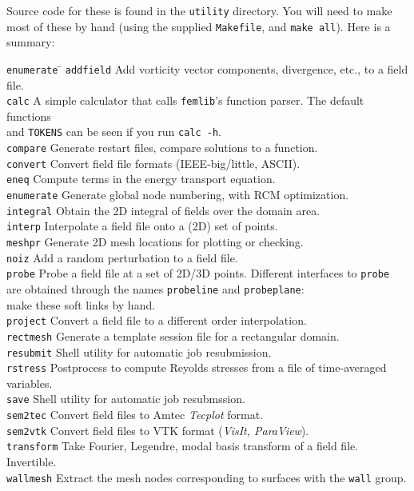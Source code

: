 \documentclass[11pt,a4paper]{report}
\begin{document}
Source code for these is found in the \texttt{utility} directory. You
will need to make most of these by hand (using the supplied
\texttt{Makefile}, and \texttt{make all}).  Here is a summary:
\begin{tabbing}
\texttt{enumerate}  \= \kill
\texttt{addfield} \>   
        Add vorticity vector components, divergence, etc., to a field
	file.\\
\texttt{calc} \>      
        A simple calculator that calls \verb+femlib+'s function
        parser. The default functions\\\>and \texttt{TOKENS} can be seen
        if you run \texttt{calc -h}.\\
\texttt{compare} \>   
        Generate restart files, compare solutions to a function.\\
\texttt{convert} \>   
        Convert field file formats (IEEE-big/little, ASCII).\\
\texttt{eneq} \>   
        Compute terms in the energy transport equation.\\
\texttt{enumerate}  \>
        Generate global node numbering, with RCM optimization.\\
\texttt{integral} \> Obtain the 2D integral of fields over the
        domain area.\\
\texttt{interp} \>   
        Interpolate a field file onto a (2D) set of points.\\
\texttt{meshpr} \>    
        Generate 2D mesh locations for plotting or checking.\\
\texttt{noiz} \>      
        Add a random perturbation to a field file.\\
\texttt{probe} \>   
        Probe a field file at a set of 2D/3D points. Different
        interfaces to \texttt{probe}\\ \> are obtained through the names
        \texttt{probeline} and \texttt{probeplane}: \\ \> make these soft
        links by hand.\\
\texttt{project} \>   
        Convert a field file to a different order interpolation.\\
\texttt{rectmesh} \>
        Generate a template session file for a rectangular domain.\\
\texttt{resubmit} \> Shell utility for automatic job resubmission.\\
\texttt{rstress} \>
	Postprocess to compute Reyolds stresses from a file of
        time-averaged variables.\\
\texttt{save} \> Shell utility for automatic job resubmssion.\\
\texttt{sem2tec} \>   
        Convert field files to Amtec \emph{Tecplot} format.\\
\texttt{sem2vtk} \>   
        Convert field files to VTK format (\emph{VisIt, ParaView}).\\
\texttt{transform} \>      
        Take Fourier, Legendre, modal basis transform of a field
	file. Invertible.\\
\texttt{wallmesh} \>      
        Extract the mesh nodes corresponding to surfaces with the
	\verb+wall+ group.
\end{tabbing}
\end{document}
